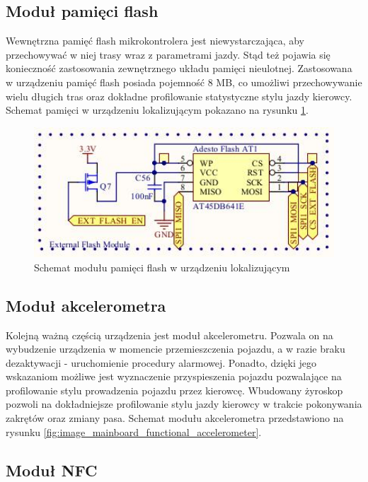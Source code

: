 \subsection{Moduł pamięci flash}

Wewnętrzna pamięć flash mikrokontrolera jest niewystarczająca, aby przechowywać w niej trasy wraz z parametrami jazdy. Stąd też pojawia się konieczność zastosowania zewnętrznego układu pamięci nieulotnej. Zastosowana w urządzeniu pamięć flash posiada pojemność 8 MB, co umożliwi przechowywanie wielu długich tras oraz dokładne profilowanie statystyczne stylu jazdy kierowcy. Schemat pamięci w urządzeniu lokalizującym pokazano na rysunku \ref{fig:image_mainboard_functional_flash}.

\begin{figure}[H]
	\centering
	\includegraphics[width=15cm]{img/schematics/mainboard_functional_flash_memory.jpg}
	\caption{Schemat modułu pamięci flash w urządzeniu lokalizującym}
	\label{fig:image_mainboard_functional_flash}
\end{figure}

\subsection{Moduł akcelerometra}

Kolejną ważną częścią urządzenia jest moduł akcelerometru. Pozwala on na wybudzenie urządzenia w momencie przemieszczenia pojazdu, a w razie braku dezaktywacji - uruchomienie procedury alarmowej. Ponadto, dzięki jego wskazaniom możliwe jest wyznaczenie przyspieszenia pojazdu pozwalające na profilowanie stylu prowadzenia pojazdu przez kierowcę. Wbudowany żyroskop pozwoli na dokładniejsze profilowanie stylu jazdy kierowcy w trakcie pokonywania zakrętów oraz zmiany pasa.
Schemat modułu akcelerometra przedstawiono na rysunku \ref{fig:image_mainboard_functional_accelerometer}.


\subsection{Moduł NFC}

